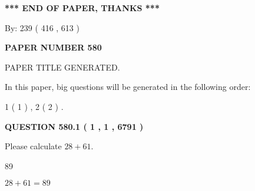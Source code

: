\documentclass[12pt]{article}
\begin{document}
   
\vspace{1.0in} 
{\textbf{\large{ *** END OF PAPER, THANKS *** }}} 
   
   
\hspace{1.0in} By: 
 239 ( 416 ,  613 )
   
   
   
   
\newpage 
\setcounter{page}{ 
   580001 } 
   
   
   
   
 {\textbf{ \Large{ PAPER NUMBER  580  }}}
   
   
\vspace{0.2in}
   
   
   
   
   
   
   
   
 \vspace{0.2in}
 
 
 
 
   
   
 PAPER TITLE GENERATED.
   
   
   
\vspace{0.2in}
   
In this paper, big questions will be generated in the following order: 
   
   
   1 ( 1 )
 ,
   2 ( 2 )
 .
  
\vspace{0.2in}
  
{\textbf{\Large{QUESTION
580.1 
 ( 1 , 1 , 6791 )
}}}
  
  
 
Please calculate $ %
28 +  %
61 $.
 
 
 
\noindent{}
 
 

89
 
 
\noindent{}
 
 

 
 
 
\noindent{}
 
 

$ %
28 +  %
61=   %
89$
 
\end{document}
